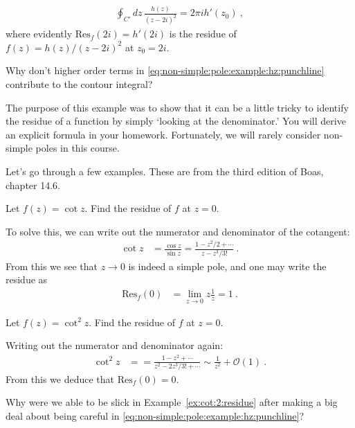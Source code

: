 \begin{align}
  \oint_{C'}dz\, \frac{h(z)}{(z-2i)^2}
  = 2\pi i h'(z_0) \ ,
\end{align}
where evidently $\text{Res}_f(2i)=h'(2i)$ is the residue of $f(z)=h(z)/(z-2i)^2$ at $z_0=2i$. 
\begin{exercise}
Why don't higher order terms in \eqref{eq:non-simple:pole:example:hz:punchline} contribute to the contour integral?
\end{exercise}
The purpose of this example was to show that it can be a little tricky to identify the residue of a function by simply `looking at the denominator.' You will derive an explicit formula in your homework. Fortunately, we will rarely consider non-simple poles in this course. 


Let's go through a few examples. These are from the third edition of Boas, chapter 14.6. 

\begin{example}
Let $f(z)=\cot z$. Find the residue of $f$ at $z=0$. 

To solve this, we can write out the numerator and denominator of the cotangent:
\begin{align}
  \cot z &= \frac{\cos z}{\sin z}
  = \frac{1-z^2/2 + \cdots}{z - z^3/3!} \ .
\end{align}
From this we see that $z\to 0$ is indeed a simple pole, and one may write the residue as
\begin{align}
  \text{Res}_f(0) &= \lim_{z\to 0} z \frac{1}{z} = 1 \ .
\end{align}
\end{example}


\begin{example}\label{ex:cot:2:residue}
Let $f(z)=\cot^2 z$. Find the residue of $f$ at $z=0$. 

Writing out the numerator and denominator again:
\begin{align}
  \cot^2 z &= 
  = \frac{1-z^2 + \cdots}{z^2 - 2z^3/3! + \cdots} 
  \sim \frac{1}{z^2} + \mathcal O(1)
  \ .
\end{align}
From this we deduce that $\text{Res}_f(0) = 0$. 
\end{example}

\begin{exercise}
Why were we able to be slick in Example~\eqref{ex:cot:2:residue} after making a big deal about being careful in \eqref{eq:non-simple:pole:example:hz:punchline}?
\end{exercise}

